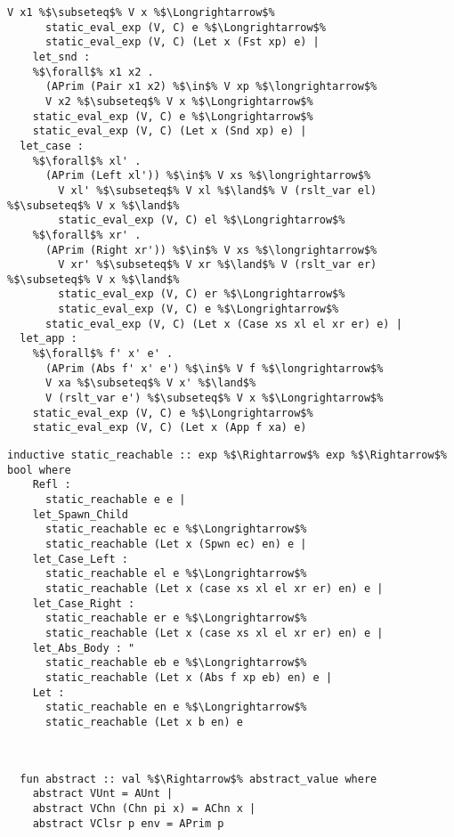 \documentclass{article}
\begin{document}
\begin{lstlisting}[style=codestyle1, escapechar=\%]
        V x1 %$\subseteq$% V x %$\Longrightarrow$% 
      static_eval_exp (V, C) e %$\Longrightarrow$% 
      static_eval_exp (V, C) (Let x (Fst xp) e) |
    let_snd : 
    %$\forall$% x1 x2 .
      (APrim (Pair x1 x2) %$\in$% V xp %$\longrightarrow$%
      V x2 %$\subseteq$% V x %$\Longrightarrow$% 
    static_eval_exp (V, C) e %$\Longrightarrow$% 
    static_eval_exp (V, C) (Let x (Snd xp) e) |
  let_case :
    %$\forall$% xl' .
      (APrim (Left xl')) %$\in$% V xs %$\longrightarrow$%
        V xl' %$\subseteq$% V xl %$\land$% V (rslt_var el) %$\subseteq$% V x %$\land$%
        static_eval_exp (V, C) el %$\Longrightarrow$%
    %$\forall$% xr' .
      (APrim (Right xr')) %$\in$% V xs %$\longrightarrow$%
        V xr' %$\subseteq$% V xr %$\land$% V (rslt_var er) %$\subseteq$% V x %$\land$%
        static_eval_exp (V, C) er %$\Longrightarrow$%
        static_eval_exp (V, C) e %$\Longrightarrow$% 
      static_eval_exp (V, C) (Let x (Case xs xl el xr er) e) |
  let_app :
    %$\forall$% f' x' e' .
      (APrim (Abs f' x' e') %$\in$% V f %$\longrightarrow$%
      V xa %$\subseteq$% V x' %$\land$%
      V (rslt_var e') %$\subseteq$% V x %$\Longrightarrow$% 
    static_eval_exp (V, C) e %$\Longrightarrow$% 
    static_eval_exp (V, C) (Let x (App f xa) e)

  \end{lstlisting}



\begin{lstlisting}[style=codestyle1, escapechar=\%]
  inductive static_reachable :: exp %$\Rightarrow$% exp %$\Rightarrow$% bool where
    Refl :
      static_reachable e e | 
    let_Spawn_Child
      static_reachable ec e %$\Longrightarrow$%
      static_reachable (Let x (Spwn ec) en) e |
    let_Case_Left :
      static_reachable el e %$\Longrightarrow$%
      static_reachable (Let x (case xs xl el xr er) en) e |
    let_Case_Right :
      static_reachable er e %$\Longrightarrow$%
      static_reachable (Let x (case xs xl el xr er) en) e |
    let_Abs_Body : "
      static_reachable eb e %$\Longrightarrow$%
      static_reachable (Let x (Abs f xp eb) en) e | 
    Let :
      static_reachable en e %$\Longrightarrow$%
      static_reachable (Let x b en) e
  \end{lstlisting}


\begin{lstlisting}[style=codestyle1, escapechar=\%]


  fun abstract :: val %$\Rightarrow$% abstract_value where
    abstract VUnt = AUnt |
    abstract VChn (Chn pi x) = AChn x |
    abstract VClsr p env = APrim p

  \end{lstlisting}
\end{document}
